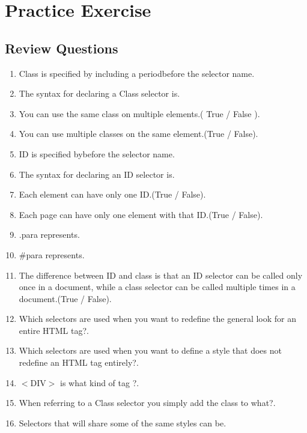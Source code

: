 \documentclass[11pt,a4paper]{article}
\begin{document}
\section*{Practice Exercise}
\subsection*{Review Questions}
\begin{enumerate}\itemsep10pt
\item Class is specified by including a period\underline{\hspace{3cm}}before the selector name.
\item The syntax for declaring a Class selector is\underline{\hspace{3cm}}.
\item You can use the same class on multiple elements.( True / False )\underline{\hspace{3cm}}.
\item You can use multiple classes on the same element.(True / False)\underline{\hspace{3cm}}.
\item ID is specified by\underline{\hspace{3cm}}before the selector name.
\item The syntax for declaring an ID selector is\underline{\hspace{3cm}}.
\item Each element can have only one ID.(True / False)\underline{\hspace{3cm}}.
\item Each page can have only one element with that ID.(True / False)\underline{\hspace{3cm}}.
\item .para represents\underline{\hspace{3cm}}.
\item \#para represents\underline{\hspace{3cm}}.
\item The difference between ID and class is that an ID selector can be called only once in a document, while a class selector can be called multiple times in a document.(True / False)\underline{\hspace{3cm}}.
\item Which selectors are used when you want to redefine the general look for an entire HTML tag?\underline{\hspace{3cm}}.
\item Which selectors are used when you want to define a style that does not redefine an HTML tag entirely?\underline{\hspace{3cm}}.
\item $<$DIV$>$ is what kind of tag ?\underline{\hspace{3cm}}.
\item When referring to a Class selector you simply add the class to what?\underline{\hspace{3cm}}.
\item Selectors that will share some of the same styles can be\underline{\hspace{3cm}}.
\end{enumerate}
\end{document}
